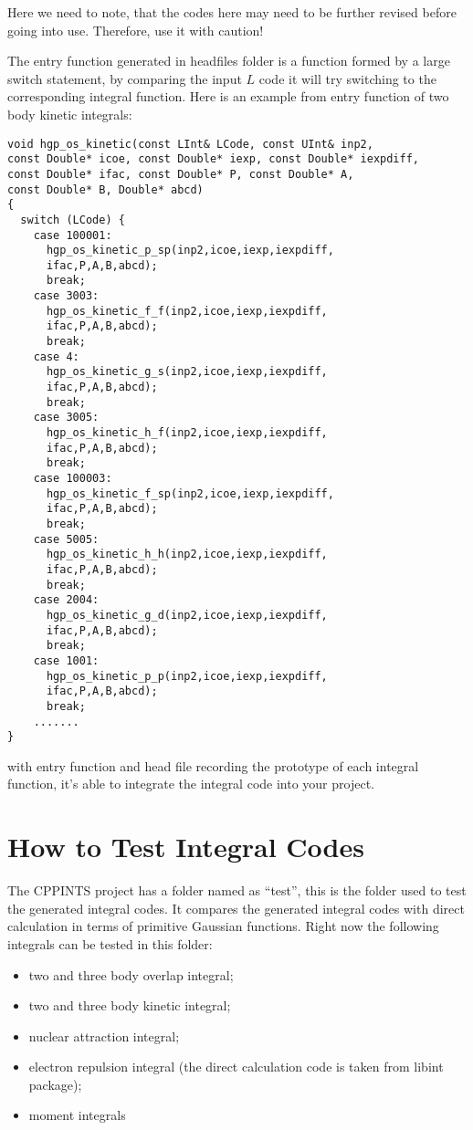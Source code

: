 Here we need to note, that the codes here may need to be further revised before going into
use. Therefore, use it with caution!

The entry function generated in headfiles folder is a function formed by a large
switch statement, by comparing the input $L$ code it will try switching to the 
corresponding integral function. Here is an example from entry function of 
two body kinetic integrals:
\begin{verbatim}
void hgp_os_kinetic(const LInt& LCode, const UInt& inp2, 
const Double* icoe, const Double* iexp, const Double* iexpdiff, 
const Double* ifac, const Double* P, const Double* A, 
const Double* B, Double* abcd)
{
  switch (LCode) {
    case 100001:
      hgp_os_kinetic_p_sp(inp2,icoe,iexp,iexpdiff,
      ifac,P,A,B,abcd);
      break;
    case 3003:
      hgp_os_kinetic_f_f(inp2,icoe,iexp,iexpdiff,
      ifac,P,A,B,abcd);
      break;
    case 4:
      hgp_os_kinetic_g_s(inp2,icoe,iexp,iexpdiff,
      ifac,P,A,B,abcd);
      break;
    case 3005:
      hgp_os_kinetic_h_f(inp2,icoe,iexp,iexpdiff,
      ifac,P,A,B,abcd);
      break;
    case 100003:
      hgp_os_kinetic_f_sp(inp2,icoe,iexp,iexpdiff,
      ifac,P,A,B,abcd);
      break;
    case 5005:
      hgp_os_kinetic_h_h(inp2,icoe,iexp,iexpdiff,
      ifac,P,A,B,abcd);
      break;
    case 2004:
      hgp_os_kinetic_g_d(inp2,icoe,iexp,iexpdiff,
      ifac,P,A,B,abcd);
      break;
    case 1001:
      hgp_os_kinetic_p_p(inp2,icoe,iexp,iexpdiff,
      ifac,P,A,B,abcd);
      break;
    .......
}
\end{verbatim} 
with entry function and head file recording the prototype of each integral
function, it's able to integrate the integral code into your project.

\section{How to Test Integral Codes}
%
%
%
The CPPINTS project has a folder named as ``test'', this is the folder
used to test the generated integral codes. It compares the generated
integral codes with direct calculation in terms of primitive Gaussian
functions. Right now the following integrals can be tested in this 
folder:
\begin{itemize}
 \item two and three body overlap integral;
 \item two and three body kinetic integral;
 \item nuclear attraction integral;
 \item electron repulsion integral (the direct calculation code is taken from
 libint package);
 \item moment integrals
\end{itemize}
 
